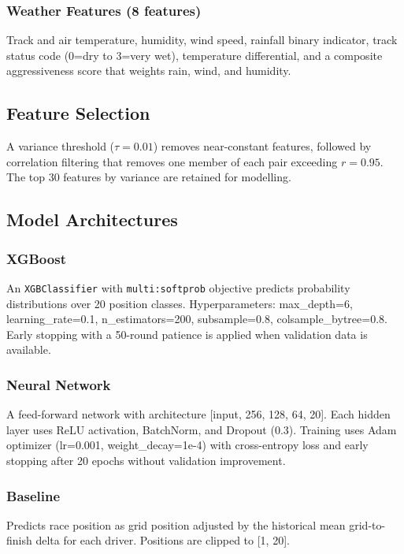 \subsubsection{Weather Features (8 features)}
Track and air temperature, humidity, wind speed, rainfall binary indicator, track
status code (0=dry to 3=very wet), temperature differential, and a composite
aggressiveness score that weights rain, wind, and humidity.

\subsection{Feature Selection}

A variance threshold ($\tau = 0.01$) removes near-constant features, followed by
correlation filtering that removes one member of each pair exceeding $r = 0.95$.
The top 30 features by variance are retained for modelling.

\subsection{Model Architectures}

\subsubsection{XGBoost}
An \texttt{XGBClassifier} with \texttt{multi:softprob} objective predicts
probability distributions over 20 position classes. Hyperparameters: max\_depth=6,
learning\_rate=0.1, n\_estimators=200, subsample=0.8, colsample\_bytree=0.8.
Early stopping with a 50-round patience is applied when validation data is available.

\subsubsection{Neural Network}
A feed-forward network with architecture [input, 256, 128, 64, 20]. Each hidden
layer uses ReLU activation, BatchNorm, and Dropout (0.3). Training uses Adam
optimizer (lr=0.001, weight\_decay=1e-4) with cross-entropy loss and early stopping
after 20 epochs without validation improvement.

\subsubsection{Baseline}
Predicts race position as grid position adjusted by the historical mean
grid-to-finish delta for each driver. Positions are clipped to [1, 20].

